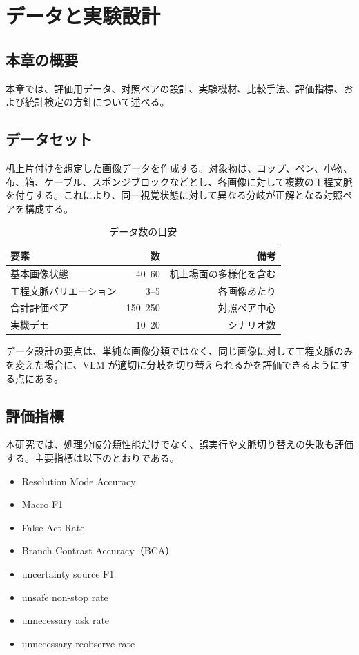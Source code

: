 \chapter{データと実験設計}

\section{本章の概要}

本章では、評価用データ、対照ペアの設計、実験機材、比較手法、評価指標、および統計検定の方針について述べる。

\section{データセット}

机上片付けを想定した画像データを作成する。対象物は、コップ、ペン、小物、布、箱、ケーブル、スポンジブロックなどとし、各画像に対して複数の工程文脈を付与する。これにより、同一視覚状態に対して異なる分岐が正解となる対照ペアを構成する。

\begin{table}[tbp]
\centering
\caption{データ数の目安}
\label{tab:dataset}
\begin{tabular}{lrr}
\toprule
要素 & 数 & 備考 \\
\midrule
基本画像状態 & 40--60 & 机上場面の多様化を含む \\
工程文脈バリエーション & 3--5 & 各画像あたり \\
合計評価ペア & 150--250 & 対照ペア中心 \\
実機デモ & 10--20 & シナリオ数 \\
\bottomrule
\end{tabular}
\end{table}

データ設計の要点は、単純な画像分類ではなく、同じ画像に対して工程文脈のみを変えた場合に、VLM が適切に分岐を切り替えられるかを評価できるようにする点にある。

\section{評価指標}

本研究では、処理分岐分類性能だけでなく、誤実行や文脈切り替えの失敗も評価する。主要指標は以下のとおりである。
\begin{itemize}
  \item Resolution Mode Accuracy
  \item Macro F1
  \item False Act Rate
  \item Branch Contrast Accuracy（BCA）
  \item uncertainty source F1
  \item unsafe non-stop rate
  \item unnecessary ask rate
  \item unnecessary reobserve rate
\end{itemize}

